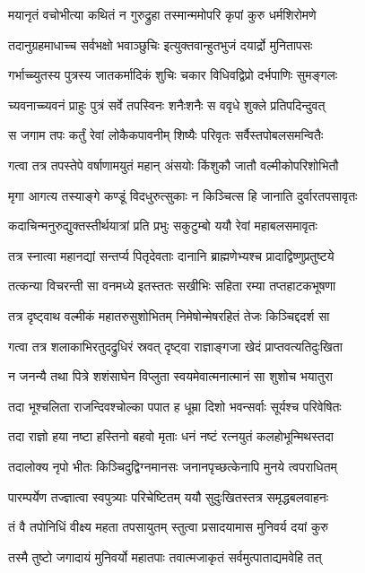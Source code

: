 \twolineshloka
{मयानृतं वचोभीत्या कथितं न गुरुद्रुहा}
{तस्मान्ममोपरि कृपां कुरु धर्मशिरोमणे}%

\twolineshloka
{तदानुग्रहमाधाच्च सर्वभक्षो भवाञ्छुचिः}
{इत्युक्तवान्हुतभुजं दयार्द्रो मुनितापसः}%

\twolineshloka
{गर्भाच्च्युतस्य पुत्रस्य जातकर्मादिकं शुचिः}
{चकार विधिवद्विप्रो दर्भपाणिः सुमङ्गलः}%

\twolineshloka
{च्यवनाच्च्यवनं प्राहुः पुत्रं सर्वे तपस्विनः}
{शनैःशनैः स ववृधे शुक्ले प्रतिपदिन्दुवत्}%

\twolineshloka
{स जगाम तपः कर्तुं रेवां लोकैकपावनीम्}
{शिष्यैः परिवृतः सर्वैस्तपोबलसमन्वितैः}%

\twolineshloka
{गत्वा तत्र तपस्तेपे वर्षाणामयुतं महान्}
{अंसयोः किंशुकौ जातौ वल्मीकोपरिशोभितौ}%

\twolineshloka
{मृगा आगत्य तस्याङ्गे कण्डूं विदधुरुत्सुकाः}
{न किञ्चित्स हि जानाति दुर्वारतपसावृतः}%

\twolineshloka
{कदाचिन्मनुरुद्युक्तस्तीर्थयात्रां प्रति प्रभुः}
{सकुटुम्बो ययौ रेवां महाबलसमावृतः}%

\twolineshloka
{तत्र स्नात्वा महानद्यां सन्तर्प्य पितृदेवताः}
{दानानि ब्राह्मणेभ्यश्च प्रादाद्विष्णुप्रतुष्टये}%

\twolineshloka
{तत्कन्या विचरन्ती सा वनमध्ये इतस्ततः}
{सखीभिः सहिता रम्या तप्तहाटकभूषणा}%

\twolineshloka
{तत्र दृष्ट्वाथ वल्मीकं महातरुसुशोभितम्}
{निमेषोन्मेषरहितं तेजः किञ्चिद्ददर्श सा}%

\twolineshloka
{गत्वा तत्र शलाकाभिरतुदद्रुधिरं स्रवत्}
{दृष्ट्वा राज्ञाङ्गजा खेदं प्राप्तवत्यतिदुःखिता}%

\twolineshloka
{न जनन्यै तथा पित्रे शशंसाघेन विप्लुता}
{स्वयमेवात्मनात्मानं सा शुशोच भयातुरा}%

\twolineshloka
{तदा भूश्चलिता राजन्दिवश्चोल्का पपात ह}
{धूम्रा दिशो भवन्सर्वाः सूर्यश्च परिवेषितः}%

\twolineshloka
{तदा राज्ञो हया नष्टा हस्तिनो बहवो मृताः}
{धनं नष्टं रत्नयुतं कलहोभून्मिथस्तदा}%

\twolineshloka
{तदालोक्य नृपो भीतः किञ्चिदुद्विग्नमानसः}
{जनानपृच्छत्केनापि मुनये त्वपराधितम्}%

\twolineshloka
{पारम्पर्येण तज्ज्ञात्वा स्वपुत्र्याः परिचेष्टितम्}
{ययौ सुदुःखितस्तत्र समृद्धबलवाहनः}%

\twolineshloka
{तं वै तपोनिधिं वीक्ष्य महता तपसायुतम्}
{स्तुत्वा प्रसादयामास मुनिवर्य दयां कुरु}%

\twolineshloka
{तस्मै तुष्टो जगादायं मुनिवर्यो महातपाः}
{तवात्मजाकृतं सर्वमुत्पाताद्यमवेहि तत्}%

